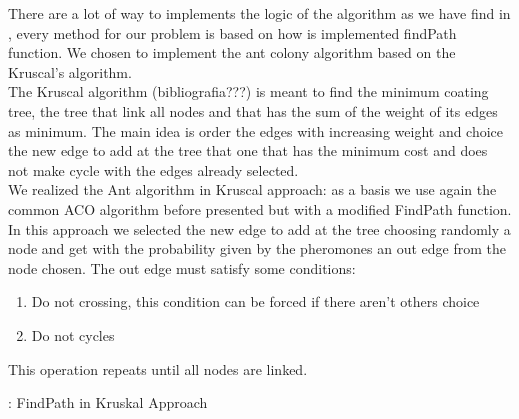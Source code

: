 There are a lot of way to implements the logic of the algorithm as we have find in \cite{nedlin2017ant}, every method for our problem is based on how is implemented findPath function. We chosen to implement the ant colony algorithm based on the Kruscal’s algorithm. \\
The Kruscal algorithm (bibliografia???) is meant to find the minimum coating tree, the tree that link all nodes and that has the sum of the weight of its edges as minimum. The main idea is order the edges with increasing weight and choice the new edge to add at the tree that one that has the minimum cost and does not make cycle with the edges already selected.\\
We realized the Ant algorithm in Kruscal approach: as a basis we use again the common ACO algorithm before presented but with a modified FindPath function. In this approach we selected the new edge to add at the tree choosing randomly a node and get with the probability given by the pheromones an out edge from the node chosen. The out edge must satisfy some conditions:
\begin{enumerate}
\setlength{\parskip}{0pt}
\setlength{\itemsep}{0pt plus 1pt}
\item Do not crossing, this condition can be forced if there aren’t others choice
\item Do not cycles
\end{enumerate}
This operation repeats until all nodes are linked.

\begin{algorithm}[H]
\caption{: FindPath in Kruskal Approach} \label{alg:SC}
\begin{algorithmic} 
\REPEAT
{}
\end{algorithmic}
\end{algorithm}


